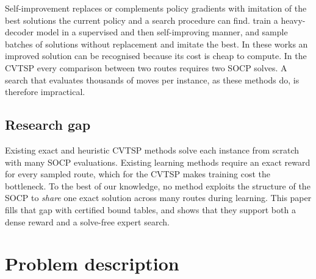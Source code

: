 \documentclass[preprint,review,12pt,authoryear]{elsarticle}
\begin{document}
Self-improvement replaces or complements policy gradients with imitation of the best solutions the current
policy and a search procedure can find. \citet{luo2023neural} train a heavy-decoder model in a
supervised and then self-improving manner, and \citet{pirnay2024self} sample batches of solutions without
replacement and imitate the best. In these works an improved solution can be recognised because its cost is
cheap to compute. In the CVTSP every comparison between two routes requires two SOCP solves. A search that
evaluates thousands of moves per instance, as these methods do, is therefore impractical.

\subsection{Research gap}
Existing exact and heuristic CVTSP methods solve each instance from scratch with many SOCP evaluations.
Existing learning methods require an exact reward for every sampled route, which for the CVTSP makes training
cost the bottleneck. To the best of our knowledge, no method exploits the structure of the SOCP to
\emph{share} one exact solution across many routes during learning. This paper fills that gap with certified
bound tables, and shows that they support both a dense reward and a solve-free expert search.

\section{Problem description}\label{sec:problem}
\end{document}
